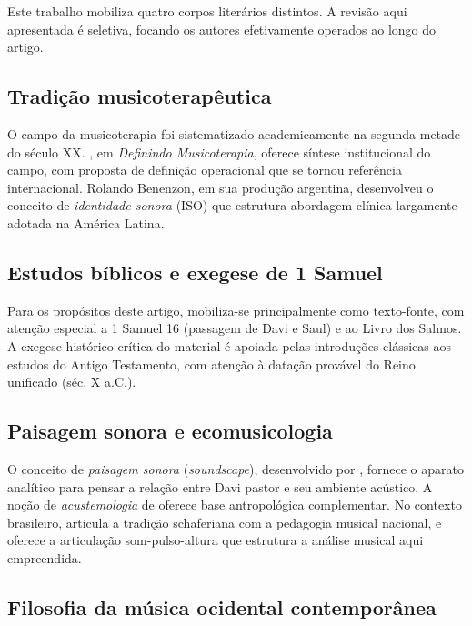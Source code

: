 \documentclass[12pt,a4paper]{article}
\begin{document}
Este trabalho mobiliza quatro corpos literários distintos. A revisão aqui apresentada é seletiva, focando os autores efetivamente operados ao longo do artigo.

\subsection{Tradição musicoterapêutica}

O campo da musicoterapia foi sistematizado academicamente na segunda metade do século XX. \citet{Bruscia2000}, em \emph{Definindo Musicoterapia}, oferece síntese institucional do campo, com proposta de definição operacional que se tornou referência internacional. Rolando Benenzon, em sua produção argentina, desenvolveu o conceito de \emph{identidade sonora} (ISO) que estrutura abordagem clínica largamente adotada na América Latina.

\subsection{Estudos bíblicos e exegese de 1 Samuel}

Para os propósitos deste artigo, mobiliza-se principalmente \citet{Biblia1993} como texto-fonte, com atenção especial a 1 Samuel 16 (passagem de Davi e Saul) e ao Livro dos Salmos. A exegese histórico-crítica do material é apoiada pelas introduções clássicas aos estudos do Antigo Testamento, com atenção à datação provável do Reino unificado (séc. X a.C.).

\subsection{Paisagem sonora e ecomusicologia}

O conceito de \emph{paisagem sonora} (\emph{soundscape}), desenvolvido por \citet{Schafer1994, Schafer1991}, fornece o aparato analítico para pensar a relação entre Davi pastor e seu ambiente acústico. A noção de \emph{acustemologia} de \citet{Feld1982} oferece base antropológica complementar. No contexto brasileiro, \citet{Fonterrada2008} articula a tradição schaferiana com a pedagogia musical nacional, e \citet{Wisnik1989} oferece a articulação som-pulso-altura que estrutura a análise musical aqui empreendida.

\subsection{Filosofia da música ocidental contemporânea}
\end{document}
